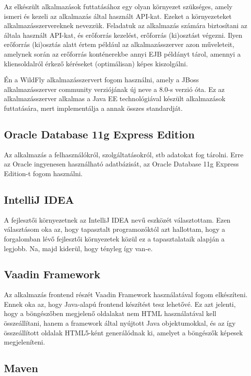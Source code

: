 \documentclass[centeredchapter]{thesis-ekf}
\theoremstyle{definition}
\theoremstyle{remark}
\begin{document}
Az elkészült alkalmazások futtatásához egy olyan környezet szükséges, amely ismeri és kezeli az alkalmazás által használt API-kat. Ezeket a környezeteket alkalmazásszervereknek nevezzük. 
Feladatuk az alkalmazás számára biztosítani az általa használt API-kat, és erőforrás kezelést, erőforrás (ki)osztást végezni. Ilyen erőforrás (ki)osztás alatt értem például az alkalmazásszerver azon műveleteit, amelynek során az erőforrás konténerekbe annyi EJB példányt tárol, amennyi a kliensoldalról érkező kéréseket (optimálisan) képes kiszolgálni.

Én a WildFly alkalmazásszervert fogom használni, amely a JBoss alkalmazásszerver community verziójának új neve a 8.0-s verzió óta. Ez az alkalmazásszerver alkalmas a Java EE technológiával készült alkalmazások futtatására, mert implementálja a annak összes standardját.  

\subsection{Oracle Database 11g Express Edition}

Az alkalmazás a felhasználókról, szolgáltatásokról, stb adatokat fog tárolni. Erre az Oracle ingyenesen használható adatbázisát, az Oracle Database 11g Express Edition-t fogom használni.

\subsection{IntelliJ IDEA}

A fejlesztői környezetnek az IntelliJ IDEA nevű eszközét választottam. Ezen választásom oka az, hogy tapasztalt programozóktól azt hallottam, hogy a forgalomban lévő fejlesztői környezetek közül ez a tapasztalataik alapján a legjobb. Na, majd kiderül, hogy tényleg így van-e.

\subsection{Vaadin Framework}

Az alkalmazás frontend részét Vaadin Framework használatával fogom elkészíteni. Ennek oka az, hogy Java-alapú frontend készítést tesz lehetővé. Ez azt jelenti, hogy a böngészőben megjelenő oldalakat nem HTML használatával kell összeállítani, hanem a framework által nyújtott Java objektumokkal, és az így összeállított oldalak HTML5-ként generálódnak ki, amelyet a böngészők képesek megjeleníteni.

\subsection{Maven}
\end{document}

